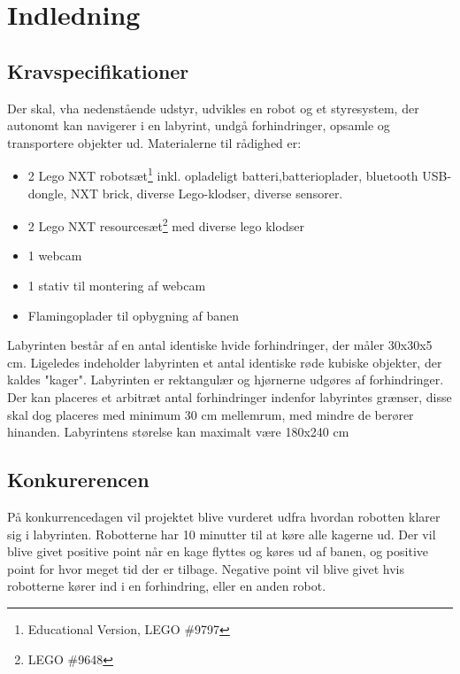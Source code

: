\chapter{Indledning}

\section{Kravspecifikationer}
Der skal, vha nedenstående udstyr, udvikles en robot og et styresystem, der autonomt kan navigerer i en labyrint, undgå forhindringer, opsamle og transportere objekter ud.
Materialerne til rådighed er:
\begin{itemize}
\item 2 Lego NXT robotsæt\footnote{Educational Version, LEGO \#9797} inkl. opladeligt batteri,batterioplader, bluetooth USB-dongle, NXT brick, diverse Lego-klodser, diverse sensorer.
\item 2 Lego NXT resourcesæt\footnote{LEGO \#9648} med diverse lego klodser
\item 1 webcam
\item 1 stativ til montering af webcam
\item Flamingoplader til opbygning af banen
\end{itemize}

Labyrinten består af en antal identiske hvide forhindringer, der måler 30x30x5 cm. Ligeledes indeholder labyrinten et antal identiske røde kubiske objekter, der kaldes "kager". Labyrinten er rektangulær og hjørnerne udgøres af forhindringer. Der kan placeres et arbitræt antal forhindringer indenfor labyrintes grænser, disse skal dog placeres med minimum 30 cm mellemrum, med mindre de berører hinanden. Labyrintens størelse kan maximalt være 180x240 cm

\section{Konkurerencen}
På konkurrencedagen vil projektet blive vurderet udfra hvordan robotten klarer sig i labyrinten. Robotterne har 10 minutter til at køre alle kagerne ud. Der vil blive givet positive point når en kage flyttes og køres ud af banen, og positive point for hvor meget tid der er tilbage. Negative point vil blive givet hvis robotterne kører ind i en forhindring, eller en anden robot.